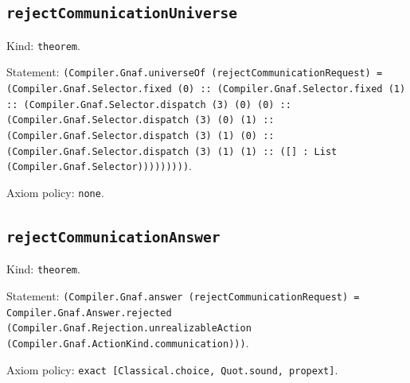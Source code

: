 \documentclass[11pt]{article}
\begin{document}
\subsection*{\texttt{rejectCommunicationUniverse}}
\noindent Kind: \texttt{theorem}.\par
\noindent Statement: \texttt{(Compiler.Gnaf.universeOf (rejectCommunicationRequest) = (Compiler.Gnaf.Selector.fixed (0) :: (Compiler.Gnaf.Selector.fixed (1) :: (Compiler.Gnaf.Selector.dispatch (3) (0) (0) :: (Compiler.Gnaf.Selector.dispatch (3) (0) (1) :: (Compiler.Gnaf.Selector.dispatch (3) (1) (0) :: (Compiler.Gnaf.Selector.dispatch (3) (1) (1) :: ([] : List (Compiler.Gnaf.Selector)))))))))}.\par
\noindent Axiom policy: \texttt{none}.\par
\subsection*{\texttt{rejectCommunicationAnswer}}
\noindent Kind: \texttt{theorem}.\par
\noindent Statement: \texttt{(Compiler.Gnaf.answer (rejectCommunicationRequest) = Compiler.Gnaf.Answer.rejected (Compiler.Gnaf.Rejection.unrealizableAction (Compiler.Gnaf.ActionKind.communication)))}.\par
\noindent Axiom policy: \texttt{exact [Classical.choice, Quot.sound, propext]}.\par
\end{document}
